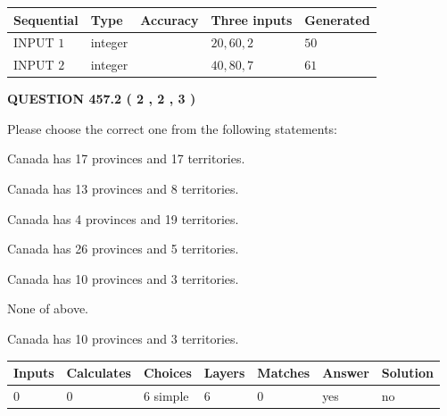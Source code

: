 \documentclass[12pt]{article}
\begin{document}
   
  
  
\noindent\begin{tabular}{|l|l|l|l|l|}
\hline
 Sequential & Type & Accuracy & Three inputs & Generated \\ 
\hline
 
 
  INPUT $  1 $ & integer &  & $
 20
 , 
 60
 , 
 2
 $ & $ 50 $ 
 \\  \hline  
 
 
  INPUT $  2 $ & integer &  & $
 40
 , 
 80
 , 
 7
 $ & $ 61 $ 
 \\  \hline  
 \end{tabular}
   
   
  
\vspace{0.2in}
  
{\textbf{\Large{QUESTION
457.2 
 ( 2 , 2 , 3 )
}}}
  
  
Please choose the correct one from the following statements:
 
 
Canada has  17 provinces and  17 territories.
 
 
Canada has  13 provinces and  8 territories.
 
 
Canada has   4 provinces and  19 territories.
 
 
Canada has  26 provinces and  5 territories.
 
 
Canada has 10  provinces and 3 territories.
 
 
 None of above.
 
 
\noindent{}
 
 
Canada has 10  provinces and 3 territories.
 
 
\noindent{}
 
 
   
   
   
   
\noindent\begin{tabular}{|l|l|l|l|l|l|l|}
 \hline
Inputs & Calculates & Choices & Layers & Matches & Answer & Solution \\ \hline
 0  & 
 0  & 
 6
  simple  
  & 
 6  & 
 0  & 
  yes & 
  no 
  \\ \hline
 \end{tabular}
   
\end{document}
